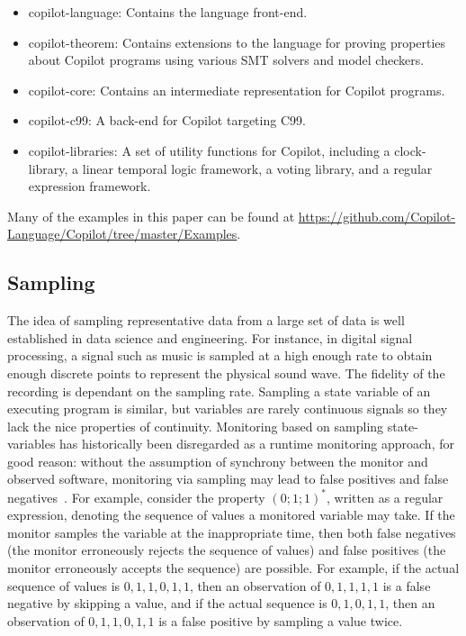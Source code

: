\begin{itemize}
\item copilot-language: Contains the language front-end.
\item copilot-theorem: Contains extensions to the language for proving
properties about Copilot programs using various SMT solvers and model checkers.
\item copilot-core: Contains an intermediate representation for Copilot programs.
\item copilot-c99: A back-end for Copilot targeting C99.
\item copilot-libraries: A set of utility functions for Copilot, including a
clock-library, a linear temporal logic framework, a voting library, and a regular
expression framework.
\end{itemize}

Many of the examples in this paper can be found at
\url{https://github.com/Copilot-Language/Copilot/tree/master/Examples}.

\subsection{Sampling} \label{sampling}
 The idea of sampling representative data from a large set of data  is well
established in data science and engineering.
%
 For instance, in digital signal processing, a signal such as music is sampled
at a high enough rate to obtain enough discrete points to represent the
physical sound wave.
%
 The fidelity of the recording is dependant on the sampling rate.
%
 Sampling a state variable of an executing program is similar, but variables
are rarely continuous signals so they lack the nice properties of continuity.
%
Monitoring based on sampling state-variables has historically been disregarded
as a runtime monitoring approach, for good reason: without the assumption of
synchrony between the monitor and observed software, monitoring via sampling
may lead to false positives and false negatives~\cite{DwyerDE08}.
%
 For example, consider the property $(0;1;1)^*$, written as a regular
expression, denoting the sequence of values a monitored variable may take.
%
 If the monitor samples the variable at the inappropriate time, then both false
negatives (the monitor erroneously rejects the sequence of values) and false
positives (the monitor erroneously accepts the sequence) are possible. 
%
 For example, if the actual sequence of values is $0,1,1,0,1,1$, then an
observation of $0,1,1,1,1$ is a false negative by skipping a value, and if the
actual sequence is $0,1,0,1,1$, then an observation of $0,1,1,0,1,1$ is a false
positive by sampling a value twice.
%


